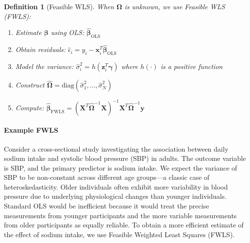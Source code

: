 \documentclass{article}
\newtheorem{definition}{Definition}
\begin{document}
\begin{definition}[Feasible WLS]
When $\boldsymbol{\Omega}$ is unknown, we use Feasible WLS (FWLS):
\begin{enumerate}
    \item Estimate $\boldsymbol{\beta}$ using OLS: $\hat{\boldsymbol{\beta}}_{\text{OLS}}$
    \item Obtain residuals: $\hat{\epsilon}_i = y_i - \mathbf{x}_i^T\hat{\boldsymbol{\beta}}_{\text{OLS}}$
    \item Model the variance: $\hat{\sigma}_i^2 = h(\mathbf{z}_i^T\boldsymbol{\gamma})$ where $h(\cdot)$ is a positive function
    \item Construct $\hat{\boldsymbol{\Omega}} = \text{diag}(\hat{\sigma}_1^2, \ldots, \hat{\sigma}_N^2)$
    \item Compute: $\hat{\boldsymbol{\beta}}_{\text{FWLS}} = (\mathbf{X}^T\hat{\boldsymbol{\Omega}}^{-1}\mathbf{X})^{-1}\mathbf{X}^T\hat{\boldsymbol{\Omega}}^{-1}\mathbf{y}$
\end{enumerate}
\end{definition}
\paragraph{Example FWLS}
Consider a cross-sectional study investigating the association between daily sodium intake and systolic blood pressure (SBP) in adults. The outcome variable is SBP, and the primary predictor is sodium intake. We expect the variance of SBP to be non-constant across different age groups---a classic case of heteroskedasticity. Older individuals often exhibit more variability in blood pressure due to underlying physiological changes than younger individuals. Standard OLS would be inefficient because it would treat the precise measurements from younger participants and the more variable measurements from older participants as equally reliable. To obtain a more efficient estimate of the effect of sodium intake, we use Feasible Weighted Least Squares (FWLS).
\end{document}
